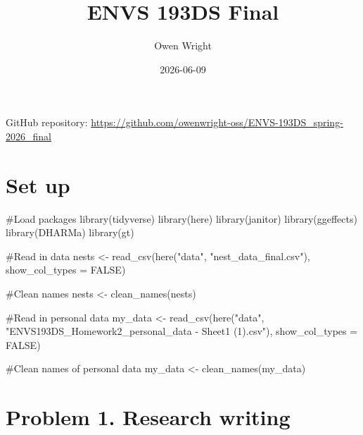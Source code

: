\documentclass[
  letterpaper,
  DIV=11,
  numbers=noendperiod]{scrartcl}
\title{ENVS 193DS Final}
\author{Owen Wright}
\date{2026-06-09}
\newenvironment{Shaded}{\begin{snugshade}}{\end{snugshade}}
\newcommand{\AttributeTok}[1]{\textcolor[rgb]{0.40,0.45,0.13}{#1}}
\newcommand{\CommentTok}[1]{\textcolor[rgb]{0.37,0.37,0.37}{#1}}
\newcommand{\ConstantTok}[1]{\textcolor[rgb]{0.56,0.35,0.01}{#1}}
\newcommand{\FunctionTok}[1]{\textcolor[rgb]{0.28,0.35,0.67}{#1}}
\newcommand{\NormalTok}[1]{\textcolor[rgb]{0.00,0.23,0.31}{#1}}
\newcommand{\OtherTok}[1]{\textcolor[rgb]{0.00,0.23,0.31}{#1}}
\newcommand{\StringTok}[1]{\textcolor[rgb]{0.13,0.47,0.30}{#1}}
\renewcommand*\contentsname{Table of contents}
\newcommand\contentsname{Table of contents}
\begin{document}
\maketitle

\renewcommand*\contentsname{Table of contents}
{
\hypersetup{linkcolor=}
\setcounter{tocdepth}{3}
\tableofcontents
}

GitHub repository:
\url{https://github.com/owenwright-oss/ENVS-193DS_spring-2026_final}

\section{Set up}\label{set-up}

\begin{Shaded}
\begin{Highlighting}[]
\CommentTok{\#Load packages}
\FunctionTok{library}\NormalTok{(tidyverse)}
\FunctionTok{library}\NormalTok{(here)}
\FunctionTok{library}\NormalTok{(janitor)}
\FunctionTok{library}\NormalTok{(ggeffects)}
\FunctionTok{library}\NormalTok{(DHARMa)}
\FunctionTok{library}\NormalTok{(gt)}

\CommentTok{\#Read in data }
\NormalTok{nests }\OtherTok{\textless{}{-}} \FunctionTok{read\_csv}\NormalTok{(}\FunctionTok{here}\NormalTok{(}\StringTok{"data"}\NormalTok{, }\StringTok{"nest\_data\_final.csv"}\NormalTok{),}
                        \AttributeTok{show\_col\_types =} \ConstantTok{FALSE}\NormalTok{)}

\CommentTok{\#Clean names }
\NormalTok{nests }\OtherTok{\textless{}{-}} \FunctionTok{clean\_names}\NormalTok{(nests)}

\CommentTok{\#Read in personal data}
\NormalTok{my\_data }\OtherTok{\textless{}{-}} \FunctionTok{read\_csv}\NormalTok{(}\FunctionTok{here}\NormalTok{(}\StringTok{"data"}\NormalTok{, }
                         \StringTok{"ENVS193DS\_Homework2\_personal\_data {-} Sheet1 (1).csv"}\NormalTok{),}
                    \AttributeTok{show\_col\_types =} \ConstantTok{FALSE}\NormalTok{)}

\CommentTok{\#Clean names of personal data}
\NormalTok{my\_data }\OtherTok{\textless{}{-}} \FunctionTok{clean\_names}\NormalTok{(my\_data)}
\end{Highlighting}
\end{Shaded}

\section{Problem 1. Research writing}\label{problem-1.-research-writing}
\end{document}
